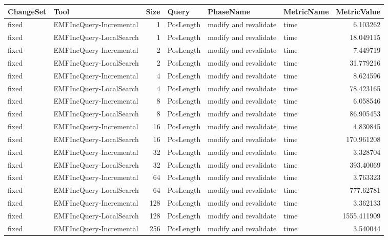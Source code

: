 \begin{table}
\centering
\footnotesize
\begin{tabular}{| l | l | r | l | l | l | r |}
\hline
\sf ChangeSet & \sf Tool & \sf Size & \sf Query & \sf PhaseName & \sf MetricName & \sf MetricValue\\\hline

fixed & EMFIncQuery-Incremental & 1 & PosLength & modify and revalidate & time & 6.103262\\\hline
fixed & EMFIncQuery-LocalSearch & 1 & PosLength & modify and revalidate & time & 18.049115\\\hline
fixed & EMFIncQuery-Incremental & 2 & PosLength & modify and revalidate & time & 7.449719\\\hline
fixed & EMFIncQuery-LocalSearch & 2 & PosLength & modify and revalidate & time & 31.779216\\\hline
fixed & EMFIncQuery-Incremental & 4 & PosLength & modify and revalidate & time & 8.624596\\\hline
fixed & EMFIncQuery-LocalSearch & 4 & PosLength & modify and revalidate & time & 78.423165\\\hline
fixed & EMFIncQuery-Incremental & 8 & PosLength & modify and revalidate & time & 6.058546\\\hline
fixed & EMFIncQuery-LocalSearch & 8 & PosLength & modify and revalidate & time & 86.905453\\\hline
fixed & EMFIncQuery-Incremental & 16 & PosLength & modify and revalidate & time & 4.830845\\\hline
fixed & EMFIncQuery-LocalSearch & 16 & PosLength & modify and revalidate & time & 170.961208\\\hline
fixed & EMFIncQuery-Incremental & 32 & PosLength & modify and revalidate & time & 3.328704\\\hline
fixed & EMFIncQuery-LocalSearch & 32 & PosLength & modify and revalidate & time & 393.40069\\\hline
fixed & EMFIncQuery-Incremental & 64 & PosLength & modify and revalidate & time & 3.763323\\\hline
fixed & EMFIncQuery-LocalSearch & 64 & PosLength & modify and revalidate & time & 777.62781\\\hline
fixed & EMFIncQuery-Incremental & 128 & PosLength & modify and revalidate & time & 3.362133\\\hline
fixed & EMFIncQuery-LocalSearch & 128 & PosLength & modify and revalidate & time & 1555.411909\\\hline
fixed & EMFIncQuery-Incremental & 256 & PosLength & modify and revalidate & time & 3.540044\\\hline

\end{tabular}
\end{table}
